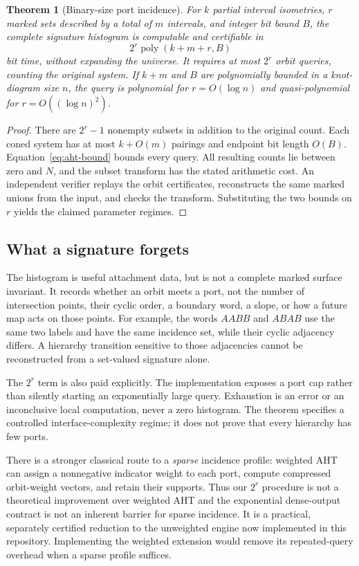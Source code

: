 \documentclass[11pt,a4paper]{article}
\newtheorem{theorem}{Theorem}[section]
\theoremstyle{definition}\newtheorem{definition}[theorem]{Definition}
\theoremstyle{remark}\newtheorem{remark}[theorem]{Remark}
\newcommand{\poly}{\operatorname{poly}}
\begin{document}
\begin{theorem}[Binary-size port incidence]\label{thm:ports}
For $k$ partial interval isometries, $r$ marked sets described by a total
of $m$ intervals, and integer bit bound $B$, the complete signature histogram
is computable and certifiable in
\[
 2^r\poly(k+m+r,B)
\]
bit time, without expanding the universe. It requires at most $2^r$ orbit
queries, counting the original system. If $k+m$ and $B$ are polynomially
bounded in a knot-diagram size $n$, the query is polynomial for
$r=O(\log n)$ and quasi-polynomial for $r=O((\log n)^2)$.
\end{theorem}
\begin{proof}
There are $2^r-1$ nonempty subsets in addition to the original count. Each
coned system has at most $k+O(m)$ pairings and endpoint bit length $O(B)$.
Equation~\eqref{eq:aht-bound} bounds every query. All resulting counts lie
between zero and $N$, and the subset transform has the stated arithmetic
cost. An independent verifier replays the orbit certificates, reconstructs
the same marked unions from the input, and checks the transform. Substituting
the two bounds on $r$ yields the claimed parameter regimes.
\end{proof}

\subsection{What a signature forgets}

The histogram is useful attachment data, but is not a complete marked
surface invariant. It records whether an orbit meets a port, not the number
of intersection points, their cyclic order, a boundary word, a slope, or
how a future map acts on those points. For example, the words $AABB$ and
$ABAB$ use the same two labels and have the same incidence set, while their
cyclic adjacency differs. A hierarchy transition sensitive to those
adjacencies cannot be reconstructed from a set-valued signature alone.

The $2^r$ term is also paid explicitly. The implementation exposes a port
cap rather than silently starting an exponentially large query. Exhaustion
is an error or an inconclusive local computation, never a zero histogram.
The theorem specifies a controlled interface-complexity regime; it does
not prove that every hierarchy has few ports.

There is a stronger classical route to a \emph{sparse} incidence profile:
weighted AHT \cite[Theorem 16]{aht} can assign a nonnegative indicator weight
to each port, compute compressed orbit-weight vectors, and retain their
supports. Thus our $2^r$ procedure is not a theoretical improvement over
weighted AHT and the exponential dense-output contract is not an inherent
barrier for sparse incidence. It is a practical, separately certified
reduction to the unweighted engine now implemented in this repository.
Implementing the weighted extension would remove its repeated-query
overhead when a sparse profile suffices.
\end{document}

